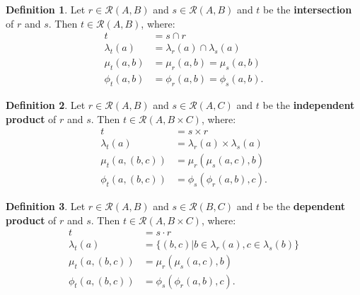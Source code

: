 \documentclass{article}
\theoremstyle{definition}
\newtheorem{definition}{Definition}[section]
\theoremstyle{plain}
\def\rule{\mathcal{R}}
\begin{document}
\begin{definition}
  Let $ r \in \rule (A, B) $
  and $ s \in \rule (A, B) $
  and $ t $ be the \textbf{intersection} of $ r $ and $ s $.
  Then $ t \in \rule (A, B) $, where:
  \begin{align}
            t        & = s \cap r \\
    \lambda_t (a)    & = \lambda_r (a) \cap \lambda_s (a) \\
        \mu_t (a, b) & = \mu_r  (a, b)    = \mu_s  (a, b) \\
       \phi_t (a, b) & = \phi_r (a, b)    = \phi_s (a, b).
  \end{align}
\end{definition}

\begin{definition}
  Let $ r \in \rule (A, B) $
  and $ s \in \rule (A, C) $
  and $ t $ be the \textbf{independent product} of $ r $ and $ s $.
  Then $ t \in \rule (A, B \times C) $, where:
  \begin{align}
            t             & = s \times r \\
    \lambda_t (a)         & = \lambda_r (a) \times \lambda_s (a) \\
        \mu_t (a, (b, c)) & =     \mu_r ( \mu_s (a, c), b) \\
       \phi_t (a, (b, c)) & =    \phi_s (\phi_r (a, b), c).
  \end{align}
\end{definition}

\begin{definition}
  Let $ r \in \rule (A, B) $
  and $ s \in \rule (B, C) $
  and $ t $ be the \textbf{dependent product} of $ r $ and $ s $.
  Then $ t \in \rule (A, B \times C) $, where:
  \begin{align}
            t             & = s \cdot r \\
    \lambda_t (a)         & = \{ (b, c) | b \in \lambda_r (a), c \in \lambda_s (b) \} \\
        \mu_t (a, (b, c)) & =     \mu_r ( \mu_s (a, c), b) \\
       \phi_t (a, (b, c)) & =    \phi_s (\phi_r (a, b), c).
  \end{align}
\end{definition}
\end{document}
